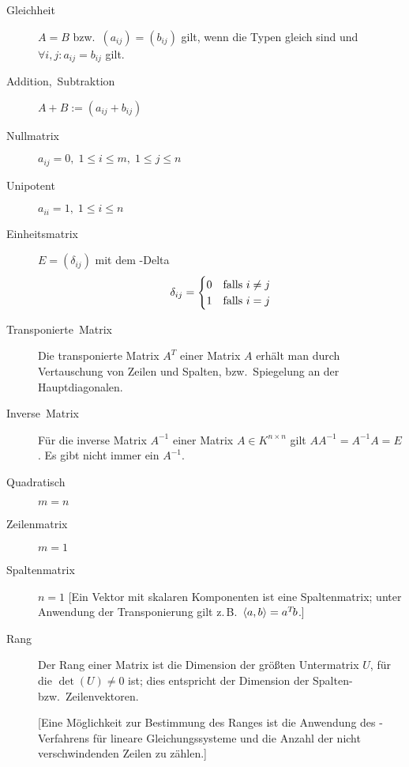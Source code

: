 \begin{description}
  \item [{Gleichheit}]
	$A=B$ bzw.~$(a_{ij})=(b_{ij})$ gilt, wenn die Typen gleich sind und $\forall i,j:a_{ij}=b_{ij}$ gilt.
  \item [{Addition,~Subtraktion}]
	$A+B:=(a_{ij}+b_{ij})$
  \item [{Nullmatrix}] 
	$a_{ij}=0,\; 1 \leq i \leq m,\; 1 \leq j \leq n$
  \item [{Unipotent}] 
	$a_{ii}=1,\; 1 \leq i \leq n$
  \item [{Einheitsmatrix}] 
	$E=(\delta_{ij})$ mit dem -Delta
	\[
	  \delta_{ij}=\begin{cases}
	    0 & \hbox{falls $i\neq j$}\\
	    1 & \hbox{falls $i=j$}
	  \end{cases}
	\]
  \item [{Transponierte~Matrix}] 
	Die transponierte Matrix $A^T$ einer Matrix $A$ erhält man durch Vertauschung von Zeilen und Spalten, bzw.~Spiegelung an der Hauptdiagonalen.
  \item [{Inverse~Matrix}] 
	Für die inverse Matrix $A^{-1}$ einer Matrix $A \in K^{n \times n}$ gilt $AA^{-1}=A^{-1}A=E$. Es gibt nicht immer ein $A^{-1}$.
  \item [{Quadratisch}] 
	$m=n$
  \item [{Zeilenmatrix}] 
	$m=1$
  \item [{Spaltenmatrix}] 
	$n=1$ [Ein Vektor mit skalaren Komponenten ist eine Spaltenmatrix; unter Anwendung der Transponierung gilt z.\,B.~$\langle a,b \rangle = a\T b$.]
  \item [{Rang}] 
	Der Rang einer Matrix ist die Dimension der größten Untermatrix $U$, für die $\det(U)\neq0$ ist; dies entspricht der Dimension der Spalten- bzw.~Zeilenvektoren.

    [Eine Möglichkeit zur Bestimmung des Ranges ist die Anwendung des -Verfahrens für lineare Gleichungssysteme und die Anzahl der nicht verschwindenden Zeilen zu zählen.]
\end{description}

